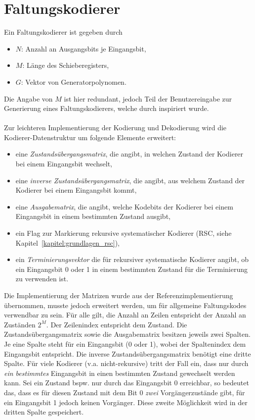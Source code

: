 \section{Faltungskodierer}
\label{kapitel:implementierung_faltungskodierer}
Ein Faltungskodierer ist gegeben durch 
\begin{itemize}
\item $N$: Anzahl an Ausgangsbits je Eingangsbit,
\item $M$: Länge des Schieberegisters,
\item $G$: Vektor von Generatorpolynomen.
\end{itemize}
Die Angabe von $M$ ist hier redundant, jedoch Teil der Benutzereingabe zur Generierung eines Faltungskodierers, welche durch \cite{morelos2006art} inspiriert wurde.
\\
\\
Zur leichteren Implementierung der Kodierung und Dekodierung wird die Kodierer-Datenstruktur um folgende Elemente erweitert:
\begin{itemize}
\item eine \emph{Zustandsübergangsmatrix}, die angibt, in welchen Zustand der Kodierer bei einem Eingangsbit wechselt,
\item eine \emph{inverse Zustandsübergangsmatrix}, die angibt, aus welchem Zustand der Kodierer bei einem Eingangsbit kommt,
\item eine \emph{Ausgabematrix}, die angibt, welche Kodebits der Kodierer bei einem Eingangsbit in einem bestimmten Zustand ausgibt,
\item ein Flag zur Markierung rekursive systematischer Kodierer (RSC, siehe Kapitel~\ref{kapitel:grundlagen_rsc}),
\item ein \emph{Terminierungsvektor} die für rekursiver systematische Kodierer angibt, ob ein Eingangsbit 0 oder 1 in einem bestimmten Zustand für die Terminierung zu verwenden ist.
\end{itemize}
Die Implementierung der Matrizen wurde aus der Referenzimplementierung übernommen, musste jedoch erweitert werden, um für allgemeine Faltungskodes verwendbar zu sein. Für alle gilt, die Anzahl an Zeilen entspricht der Anzahl an Zuständen $2^{M}$. Der Zeilenindex entspricht dem Zustand. Die Zustandsübergangsmatrix sowie die Ausgabematrix besitzen jeweils zwei Spalten. Je eine Spalte steht für ein Eingangsbit (0 oder 1), wobei der Spaltenindex dem Eingangsbit entspricht. Die inverse Zustandsübergangsmatrix benötigt eine dritte Spalte. Für viele Kodierer (v.a. nicht-rekursive) tritt der Fall ein, dass nur durch \emph{ein bestimmtes} Eingangsbit in einen bestimmten Zustand gewechselt werden kann. Sei ein Zustand bspw. nur durch das Eingangsbit 0 erreichbar, so bedeutet das, dass es für diesen Zustand mit dem Bit 0 \emph{zwei} Vorgängerzustände gibt, für ein Eingangsbit 1 jedoch keinen Vorgänger. Diese zweite Möglichkeit wird in der dritten Spalte gespeichert.
